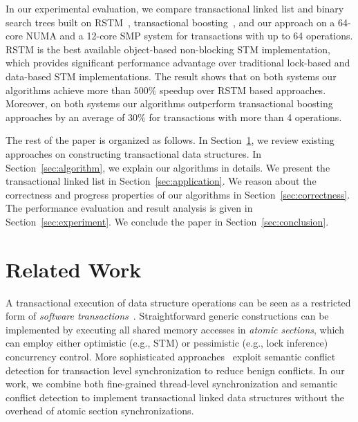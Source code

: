 \documentclass[10pt,conference,compsocconf]{IEEEtran}
\begin{document}
In our experimental evaluation, we compare transactional linked list and binary search trees built on RSTM~\cite{marathe2006lowering}, transactional boosting~\cite{herlihy2008transactional}, and our approach on a 64-core NUMA and a 12-core SMP system for transactions with up to 64 operations.
RSTM is the best available object-based non-blocking STM implementation, which provides significant performance advantage over traditional lock-based and data-based STM implementations.
The result shows that on both systems our algorithms achieve more than $500\%$ speedup over RSTM based approaches.
Moreover, on both systems our algorithms outperform transactional boosting approaches by an average of $30\%$ for transactions with more than 4 operations.

The rest of the paper is organized as follows. 
In Section~\ref{sec:related}, we review existing approaches on constructing transactional data structures.
In Section~\ref{sec:algorithm}, we explain our algorithms in details.
We present the transactional linked list in Section~\ref{sec:application}.
We reason about the correctness and progress properties of our algorithms in Section~\ref{sec:correctness}.
The performance evaluation and result analysis is given in Section~\ref{sec:experiment}.
We conclude the paper in Section~\ref{sec:conclusion}.

\section{Related Work}
\label{sec:related}
A transactional execution of data structure operations can be seen as a restricted form of \emph{software transactions}~\cite{harris2010transactional}.
Straightforward generic constructions can be implemented by executing all shared memory accesses in \emph{atomic sections}, which can employ either optimistic (e.g., STM) or pessimistic (e.g., lock inference) concurrency control.
More sophisticated approaches~\cite{bronson2010transactional,herlihy2008transactional,golan2015automatic} exploit semantic conflict detection for transaction level synchronization to reduce benign conflicts.
In our work, we combine both fine-grained thread-level synchronization and semantic conflict detection to implement transactional linked data structures without the overhead of atomic section synchronizations.
\end{document}
